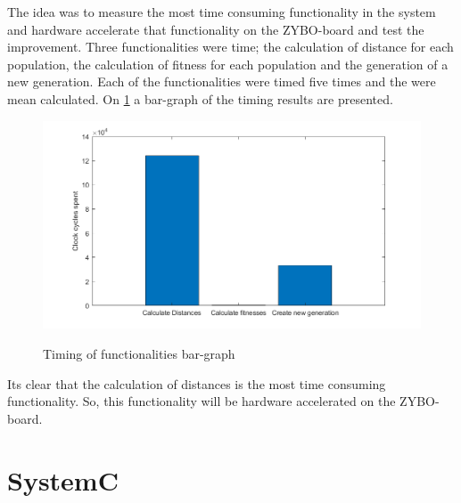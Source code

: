 The idea was to measure the most time consuming functionality in the system and hardware accelerate that functionality on the ZYBO-board and test the improvement. Three functionalities were time; the calculation of distance for each population, the calculation of fitness for each population and the generation of a new generation. Each of the functionalities were timed five times and the were mean calculated. On \cref{fig:timing_barGraph} a bar-graph of the timing results are presented. 

\begin{figure}[H]
	\centering
	{\includegraphics[width=\textwidth]{Images/timing_barGraph.png}}\\[0.5cm]
	\caption{Timing of functionalities bar-graph}
	\label{fig:timing_barGraph}
\end{figure}

Its clear that the calculation of distances is the most time consuming functionality. So, this functionality will be hardware accelerated on the ZYBO-board.








\section{SystemC}
